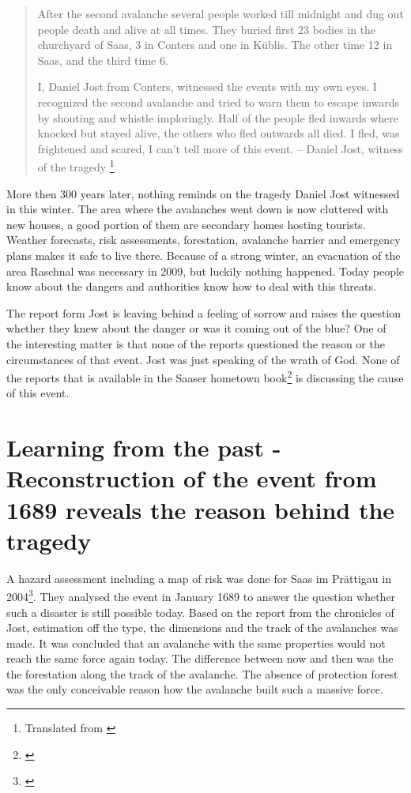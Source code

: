 \documentclass[12pt, a4paper]{article}
\begin{document}
\begin{quote}
After the second avalanche several people worked till midnight and dug out people death and alive at all times. They buried first 23 bodies in the churchyard of Saas, 3 in Conters and one in Küblis. The other time 12 in Saas, and the third time 6. 

I, Daniel Jost from Conters, witnessed the events with my own eyes. I recognized the second avalanche and tried to warn them to escape inwards by shouting and whistle imploringly. Half of the people fled inwards where knocked but stayed alive, the others who fled outwards all died. I fled, was frightened and scared, I can't tell more of this event.
 -- Daniel Jost, witness of the tragedy \footnote{Translated from \citet[p.~50-51]{hansemann1995saaser}}
\end{quote}

\setlength{\parskip}{1.5em}

More then 300 years later, nothing reminds on the tragedy Daniel Jost witnessed in this winter. The area where the avalanches went down is now cluttered with new houses, a good portion of them are secondary homes hosting tourists. Weather forecasts, risk assessments, forestation, avalanche barrier and emergency plans makes it safe to live there. Because of a strong winter, an evacuation of the area Raschnal was necessary in 2009, but luckily nothing happened. Today people know about the dangers and authorities know how to deal with this threats. 

The report form Jost is leaving behind a feeling of sorrow and raises the question whether they knew about the danger or was it coming out of the blue? One of the interesting matter is that none of the reports questioned the reason or the circumstances of that event. Jost was just speaking of the wrath of God. None of the reports that is available in the Saaser hometown book\footnote{\citet[p.~50-54]{hansemann1995saaser}} is discussing the cause of this event. 

\section*{Learning from the past -  Reconstruction of the event from 1689 reveals the reason behind the tragedy}
A hazard assessment including a map of risk was done for Saas im Prättigau in 2004\footnote{\cite{teufen2004}}. They analysed  the event in January 1689 to answer the question whether such a disaster is still possible today.  Based on the report from the chronicles of Jost, estimation off the type, the dimensions and the track of the avalanches was made. It was concluded that an avalanche with the same properties would not reach the same force again today. The difference between now and then was the the forestation along the track of the avalanche. The absence of protection forest was the only conceivable reason how the avalanche built such a massive force. 
\end{document}
